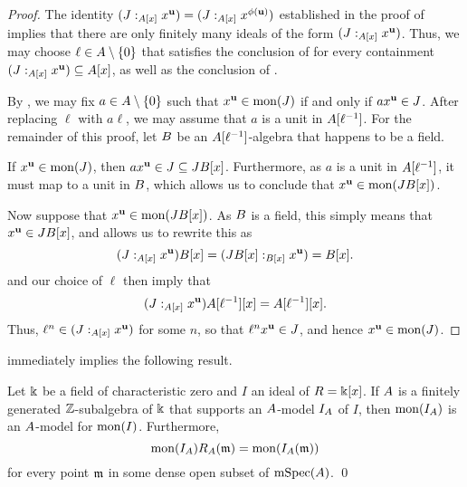 \documentclass{article}
\begin{document}
\begin{proof}
   The identity $(J:_{A[x]} x^{\mathbf{u}}) = (J:_{A[x]} x^{\phi(\mathbf{u})})$ established in the proof of  implies that there are only finitely many ideals of the form $(J:_{A[x]} x^{\mathbf{u}})$.
   Thus, we may choose $\ell \in A\setminus \{0\}$ that satisfies the conclusion of  for every containment $(J:_{A[x]} x^{\mathbf{u}}) \subseteq A[x]$, as well as the conclusion of .

   By , we may fix $a \in A \setminus \{0\}$ such that $x^{\mathbf{u}} \in \operatorname{mon}(J)$ if and only if $ax^{\mathbf{u}} \in J$.
   After replacing $\ell$ with $a \ell$, we may assume that $a$ is a unit in $A[\ell^{-1}]$.
   For the remainder of this proof, let $B$ be an $A[\ell^{-1}]$-algebra that happens to be a field.

   If $x^{\mathbf{u}} \in \operatorname{mon}(J)$, then $a x^{\mathbf{u}} \in J \subseteq J B[x]$.
   Furthermore, as $a$ is a unit in $A[\ell^{-1}]$, it must map to a unit in $B$, which allows us to conclude that $x^{\mathbf{u}} \in \operatorname{mon}(J B[x])$.

   Now suppose that $x^{\mathbf{u}} \in \operatorname{mon}(J B[x])$.
   As $B$ is a field, this simply means that $x^{\mathbf{u}} \in J B[x]$, and  allows us to rewrite this as
   \[(J:_{A[x]} x^{\mathbf{u}}) B[x] = (J B[x] :_{B[x]} x^{\mathbf{u}}) = B[x].\]
    and our choice of $\ell$ then imply that \[(J:_{A[x]} x^{\mathbf{u}}) A[\ell^{-1}][x] = A[\ell^{-1}][x].\]
   Thus, $\ell^n \in (J:_{A[x]} x^{\mathbf{u}})$ for some $n$, so that $\ell^n x^{\mathbf{u}} \in J$, and hence $x^{\mathbf{u}} \in \operatorname{mon}(J)$.
\end{proof}

 immediately implies the following result.

\begin{theorem}
   \label{mon-operation-modulo-p: T}
   Let $\Bbbk$ be a field of characteristic zero and $I$ an ideal of $R=\Bbbk[x]$.
   If $A$ is a finitely generated $\mathbb{Z}$-subalgebra of $\Bbbk$ that supports an $A$-model $I_A$ of $I$, then $\operatorname{mon}(I_A)$ is an $A$-model for $\operatorname{mon}(I)$.
   Furthermore,
   \[ \operatorname{mon}(I_A) R_A(\mathfrak{m}) = \operatorname{mon}(I_A(\mathfrak{m})) \]
   for every point $\mathfrak{m}$ in some dense open subset of $\operatorname{mSpec}(A)$. \qed
\end{theorem}
\end{document}
